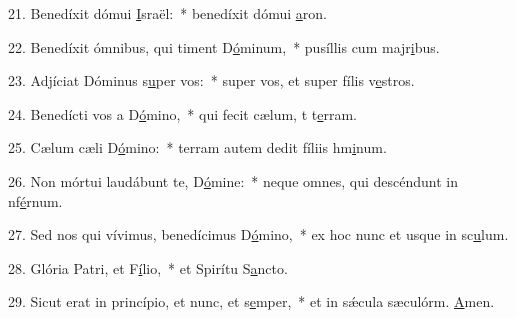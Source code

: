 21. Benedíxit dómui \uline{I}sraël:~* benedíxit dómui \uline{a}ron.\par 
22. Benedíxit ómnibus, qui timent D\uline{ó}minum,~* pusíllis cum majr\uline{i}bus.\par 
23. Adjíciat Dóminus s\uline{u}per vos:~* super vos, et super fílis v\uline{e}stros.\par 
24. Benedícti vos a D\uline{ó}mino,~* qui fecit cælum, t t\uline{e}rram.\par 
25. Cælum cæli D\uline{ó}mino:~* terram autem dedit fíliis hm\uline{i}num.\par 
26. Non mórtui laudábunt te, D\uline{ó}mine:~* neque omnes, qui descéndunt in nf\uline{é}rnum.\par 
27. Sed nos qui vívimus, benedícimus D\uline{ó}mino,~* ex hoc nunc et usque in sc\uline{u}lum.\par 
28. Glória Patri, et F\uline{í}lio,~* et Spirítu S\uline{a}ncto.\par 
29. Sicut erat in princípio, et nunc, et s\uline{e}mper,~* et in sǽcula sæculórm. \uline{A}men.\par 
